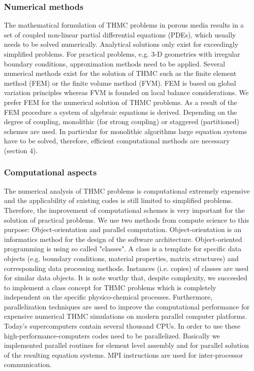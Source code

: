 \subsubsection*{Numerical methods}
The mathematical formulation of THMC problems in porous media results in a set of coupled non-linear partial differential equations (PDEs), which usually needs to be solved numerically. Analytical solutions only exist for exceedingly simplified problems. For practical problems, e.g. 3-D geometries with irregular boundary conditions, approximation methods need to be applied. Several numerical methods exist for the solution of THMC such as the finite element method (FEM) or the finite volume method (FVM). FEM is based on global variation principles whereas FVM is founded on local balance considerations. We prefer FEM for the numerical solution of THMC problems. As a result of the FEM procedure a system of algebraic equations is derived. Depending on the degree of coupling, monolithic (for strong coupling) or staggered (partitioned) schemes are used. In particular for monolithic algorithms large equation systems have to be solved, therefore, efficient computational methods are necessary (section 4).

\subsubsection*{Computational aspects}
The numerical analysis of THMC problems is computational extremely expensive and the applicability of existing codes is still limited to simplified problems. Therefore, the improvement of computational schemes is very important for the solution of practical problems. We use two methods from compute science to this purpose: Object-orientation and parallel computation. Object-orientation is an informatics method for the design of the software architecture. Object-oriented programming is using so called "classes". A class is a template for specific data objects (e.g. boundary conditions, material properties, matrix structures) and corresponding data processing methods. Instances (i.e. copies) of classes are used for similar data objects. It is note worthy that, despite complexity, we succeeded to implement a class concept for THMC problems which is completely independent on the specific physico-chemical processes. Furthermore, parallelization techniques are used to improve the computational performance for expensive numerical THMC simulations on modern parallel computer platforms. Today's supercomputers contain several thousand CPUs. In order to use these high-performance-computers codes need to be parallelized. Basically we implemented parallel routines for element level assembly and for parallel solution of the resulting equation systems. MPI instructions are used for inter-processor communication.

